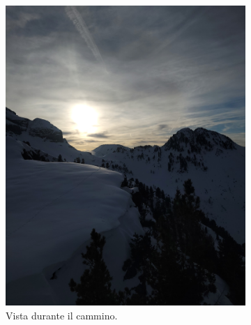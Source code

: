 \documentclass{article}
\begin{document}
\begin{figure}[H]
    \centering
    \begin{subfigure}[b]{0.45\textwidth}
        \includegraphics[width=\textwidth]{images/foto_sole.jpg}
        \caption{Vista durante il cammino.}
    \end{subfigure}
    \hfill
    \begin{subfigure}[b]{0.45\textwidth}

\end{subfigure}
\end{figure}
\end{document}
